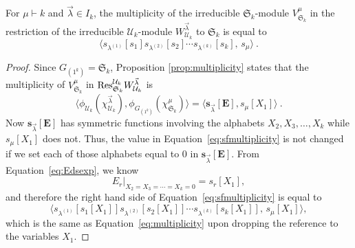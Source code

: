 \documentclass[ALCO,Unicode]{cedram}
\newcommand{\EEE}{\mathbf{E}}
\begin{document}
\begin{cor}\label{cor:plethmult}
For $\mu \vdash k$ and $\vec{\lambda} \in I_k$,
the multiplicity of the irreducible $\mathfrak{S}_k$-module
$V^\mu_{\mathfrak{S}_k}$ in the restriction of
the irreducible $\mathcal{U}_k$-module $W^{\vec{\lambda}}_{\mathcal{U}_k}$
to $\mathfrak{S}_k$ is equal to
\begin{equation}\label{eq:multiplicity}
\big\langle s_{\lambda^{(1)}}[s_1]s_{\lambda^{(2)}}[s_2]
\cdots s_{\lambda^{(k)}}[s_k], \, s_\mu \big\rangle~.
\end{equation}
\end{cor}
\begin{proof}
Since $G_{(1^k)} = \mathfrak{S}_k$,
Proposition \ref{prop:multiplicity} states that the multiplicity of
$V^{\mu}_{\mathfrak{S}_k}$ in
${\rm Res}^{\mathcal{U}_k}_{\mathfrak{S}_k} W^{\vec{\lambda}}_{\mathcal{U}_k}$ is
\begin{equation}\label{eq:sfmultiplicity}
\Big\langle \phi_{\mathcal{U}_k}(\chi^{\vec{\lambda}}_{\mathcal{U}_k}),
\phi_{G_{(1^k)}}(\chi^{\mu}_{\mathfrak{S}_k}) \Big\rangle =
\Big\langle \mathbf{s}_{\vec{\lambda}}[\EEE], s_{\mu}[X_1] \Big\rangle~.
\end{equation}
Now $\mathbf{s}_{\vec{\lambda}}[\EEE]$ has symmetric functions involving
the alphabets $X_2, X_3, \ldots, X_k$ while $s_{\mu}[X_1]$ does
not.  Thus, the value in Equation~\eqref{eq:sfmultiplicity} is not changed if we set each of those alphabets
equal to $0$ in $\mathbf{s}_{\vec{\lambda}}[\EEE]$.
From Equation~\eqref{eq:Edsexp}, we know
\[
E_r|_{X_2=X_3= \cdots =X_k=0} = s_r[X_1],
\]
and therefore the right hand side of Equation~\eqref{eq:sfmultiplicity} is equal to
\[
\big\langle s_{\lambda^{(1)}}[s_1[X_1]]
s_{\lambda^{(2)}}[s_2[X_1]]
\cdots
s_{\lambda^{(k)}}[s_k[X_1]], \, s_{\mu}[X_1] \big\rangle,
\]
which is the same as Equation~\eqref{eq:multiplicity}
upon dropping the reference to the variables $X_1$.
\end{proof}








\end{document}
